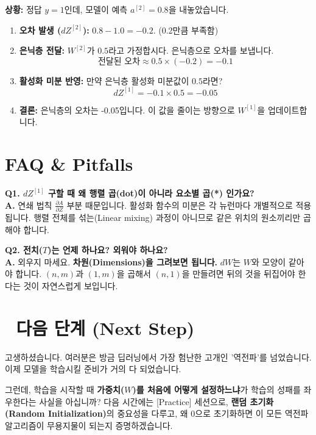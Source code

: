\documentclass[11pt,a4paper]{book}
\theoremstyle{definition}
\begin{document}
\begin{examplebox}[title={간단한 오차 역전파 예시}]
\textbf{상황:} 정답 $y=1$인데, 모델이 예측 $a^{[2]}=0.8$을 내놓았습니다.
\begin{enumerate}
    \item \textbf{오차 발생 ($dZ^{[2]}$):} $0.8 - 1.0 = -0.2$. (0.2만큼 부족함)
    \item \textbf{은닉층 전달:} $W^{[2]}$가 $0.5$라고 가정합시다. 은닉층으로 오차를 보냅니다.
    $$ \text{전달된 오차} \approx 0.5 \times (-0.2) = -0.1 $$
    \item \textbf{활성화 미분 반영:} 만약 은닉층 활성화 미분값이 $0.5$라면?
    $$ dZ^{[1]} = -0.1 \times 0.5 = -0.05 $$
    \item \textbf{결론:} 은닉층의 오차는 -0.05입니다. 이 값을 줄이는 방향으로 $W^{[1]}$을 업데이트합니다.
\end{enumerate}
\end{examplebox}

\section{FAQ \& Pitfalls}

\textbf{Q1. $dZ^{[1]}$ 구할 때 왜 행렬 곱(dot)이 아니라 요소별 곱(*) 인가요?} \\
\textbf{A.} 연쇄 법칙 $\frac{\partial A}{\partial Z}$ 부분 때문입니다. 활성화 함수의 미분은 각 뉴런마다 개별적으로 적용됩니다. 행렬 전체를 섞는(Linear mixing) 과정이 아니므로 같은 위치의 원소끼리만 곱해야 합니다.

\textbf{Q2. 전치($T$)는 언제 하나요? 외워야 하나요?} \\
\textbf{A.} 외우지 마세요. \textbf{차원(Dimensions)을 그려보면 됩니다.}
$dW$는 $W$와 모양이 같아야 합니다. $(n, m)$과 $(1, m)$을 곱해서 $(n, 1)$을 만들려면 뒤의 것을 뒤집어야 한다는 것이 자연스럽게 보입니다.

\section*{🔗 다음 단계 (Next Step)}
고생하셨습니다. 여러분은 방금 딥러닝에서 가장 험난한 고개인 '역전파'를 넘었습니다. 이제 모델을 학습시킬 준비가 거의 다 되었습니다.

그런데, 학습을 시작할 때 \textbf{가중치($W$)를 처음에 어떻게 설정하느냐}가 학습의 성패를 좌우한다는 사실을 아십니까?
다음 시간에는 [Practice] 세션으로, \textbf{랜덤 초기화(Random Initialization)}의 중요성을 다루고, 왜 0으로 초기화하면 이 모든 역전파 알고리즘이 무용지물이 되는지 증명하겠습니다.
\end{document}
